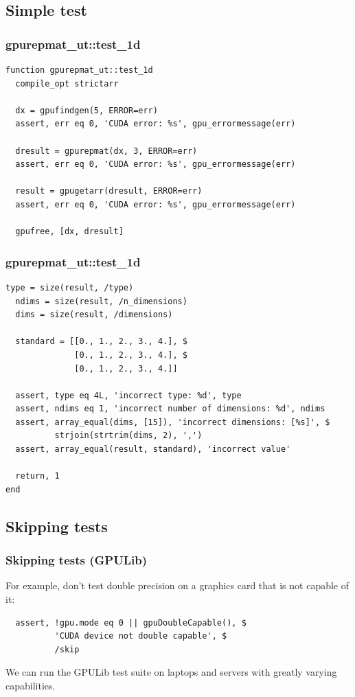 \documentclass[12pt, handout]{beamer}
\begin{document}
\subsection{Simple test}

\begin{frame}[t, fragile]
  \frametitle{gpurepmat\_ut::test\_1d}

\begin{lstlisting}[basicstyle=\ttfamily\fontsize{8pt}{8pt}\selectfont]
function gpurepmat_ut::test_1d
  compile_opt strictarr

  dx = gpufindgen(5, ERROR=err)
  assert, err eq 0, 'CUDA error: %s', gpu_errormessage(err)

  dresult = gpurepmat(dx, 3, ERROR=err)
  assert, err eq 0, 'CUDA error: %s', gpu_errormessage(err)

  result = gpugetarr(dresult, ERROR=err)
  assert, err eq 0, 'CUDA error: %s', gpu_errormessage(err)

  gpufree, [dx, dresult]
\end{lstlisting}
\end{frame}

\begin{frame}[t, fragile]
  \frametitle{gpurepmat\_ut::test\_1d}

\begin{lstlisting}[basicstyle=\ttfamily\fontsize{8pt}{8pt}\selectfont]
  type = size(result, /type)
  ndims = size(result, /n_dimensions)
  dims = size(result, /dimensions)

  standard = [[0., 1., 2., 3., 4.], $
              [0., 1., 2., 3., 4.], $
              [0., 1., 2., 3., 4.]]

  assert, type eq 4L, 'incorrect type: %d', type
  assert, ndims eq 1, 'incorrect number of dimensions: %d', ndims
  assert, array_equal(dims, [15]), 'incorrect dimensions: [%s]', $
          strjoin(strtrim(dims, 2), ',')
  assert, array_equal(result, standard), 'incorrect value'

  return, 1
end
\end{lstlisting}
\end{frame}


\subsection{Skipping tests}

\begin{frame}[t, fragile]
  \frametitle{Skipping tests (GPULib)}
For example, don't test double precision on a graphics card that is not capable of it:
\begin{lstlisting}
  assert, !gpu.mode eq 0 || gpuDoubleCapable(), $
          'CUDA device not double capable', $
          /skip
\end{lstlisting}
We can run the GPULib test suite on laptops and servers with greatly varying capabilities.
\end{frame}
\end{document}
